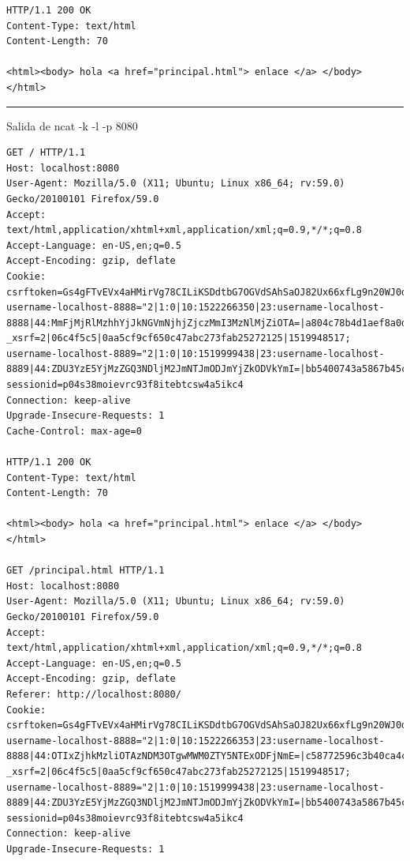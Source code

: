 \documentclass[11pt]{article}
\begin{document}
\begin{verbatim}
HTTP/1.1 200 OK
Content-Type: text/html
Content-Length: 70

<html><body> hola <a href="principal.html"> enlace </a> </body> </html>
\end{verbatim}

\begin{center}\rule{0.5\linewidth}{\linethickness}\end{center}

Salida de ncat -k -l -p 8080

\begin{verbatim}
GET / HTTP/1.1
Host: localhost:8080
User-Agent: Mozilla/5.0 (X11; Ubuntu; Linux x86_64; rv:59.0) Gecko/20100101 Firefox/59.0
Accept: text/html,application/xhtml+xml,application/xml;q=0.9,*/*;q=0.8
Accept-Language: en-US,en;q=0.5
Accept-Encoding: gzip, deflate
Cookie: csrftoken=Gs4gFTvEVx4aHMirVg78CILiKSDdtbG7OGVdSAhSaOJ82Ux66xfLg9n20WJ0dhri; username-localhost-8888="2|1:0|10:1522266350|23:username-localhost-8888|44:MmFjMjRlMzhhYjJkNGVmNjhjZjczMmI3MzNlMjZiOTA=|a804c78b4d1aef8a0d81574d1a199fb24ee5cdb33cfc3b19a17e221df844d1c5"; _xsrf=2|06c4f5c5|0aa5cf9cf650c47abc273fab25272125|1519948517; username-localhost-8889="2|1:0|10:1519999438|23:username-localhost-8889|44:ZDU3YzE5YjMzZGQ3NDljM2JmNTJmODJmYjZkODVkYmI=|bb5400743a5867b45c2dfa99852c9eac13d20d0e588218d6bdd78e8a355f8766"; sessionid=p04s38moievrc93f8itebtcsw4a5ikc4
Connection: keep-alive
Upgrade-Insecure-Requests: 1
Cache-Control: max-age=0

HTTP/1.1 200 OK
Content-Type: text/html
Content-Length: 70

<html><body> hola <a href="principal.html"> enlace </a> </body> </html>

GET /principal.html HTTP/1.1
Host: localhost:8080
User-Agent: Mozilla/5.0 (X11; Ubuntu; Linux x86_64; rv:59.0) Gecko/20100101 Firefox/59.0
Accept: text/html,application/xhtml+xml,application/xml;q=0.9,*/*;q=0.8
Accept-Language: en-US,en;q=0.5
Accept-Encoding: gzip, deflate
Referer: http://localhost:8080/
Cookie: csrftoken=Gs4gFTvEVx4aHMirVg78CILiKSDdtbG7OGVdSAhSaOJ82Ux66xfLg9n20WJ0dhri; username-localhost-8888="2|1:0|10:1522266353|23:username-localhost-8888|44:OTIxZjhkMzliOTAzNDM3OTgwMWM0ZTY5NTExODFjNmE=|c58772596c3b40ca4ca08ad1801d4ea7df1eebfe609cf6f66a8d6b15c47281ef"; _xsrf=2|06c4f5c5|0aa5cf9cf650c47abc273fab25272125|1519948517; username-localhost-8889="2|1:0|10:1519999438|23:username-localhost-8889|44:ZDU3YzE5YjMzZGQ3NDljM2JmNTJmODJmYjZkODVkYmI=|bb5400743a5867b45c2dfa99852c9eac13d20d0e588218d6bdd78e8a355f8766"; sessionid=p04s38moievrc93f8itebtcsw4a5ikc4
Connection: keep-alive
Upgrade-Insecure-Requests: 1
\end{verbatim}
\end{document}
